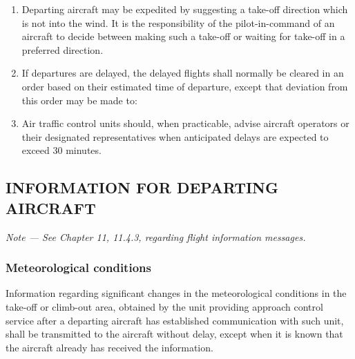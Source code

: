 \documentclass[../main.tex]{subfiles}
\begin{document}
    \begin{enumerate}
        \item Departing aircraft may be expedited by suggesting a take-off direction which is not into the wind. It is the responsibility of the pilot-in-command of an aircraft to decide between making such a take-off or waiting for take-off in a preferred direction.
        \item If departures are delayed, the delayed flights shall normally be cleared in an order based on their estimated time of departure, except that deviation from this order may be made to:


        \item Air traffic control units should, when practicable, advise aircraft operators or their designated representatives when anticipated delays are expected to exceed 30 minutes.
    \end{enumerate}

    \subsection[Information for departing aircraft]{INFORMATION FOR DEPARTING AIRCRAFT}

    \begin{enumempty}[labelindent=\parindent]
        \item \textit{Note --- See Chapter 11, 11.4.3, regarding flight information messages.}
    \end{enumempty}

    \subsubsection{Meteorological conditions}

    Information regarding significant changes in the meteorological conditions in the take-off or climb-out area, obtained by the unit providing approach control service after a departing aircraft has established communication with such unit, shall be transmitted to the aircraft without delay, except when it is known that the aircraft already has received the information.
\end{document}
